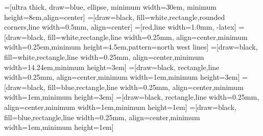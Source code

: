 
=[ultra thick, draw=blue, ellipse, minimum width=30em,
    minimum height=8em,align=center]
=[draw=black, fill=white,rectangle,rounded corners,line width=0.5mm,%
	  align=center]
=[red,line width=1.0mm, -latex]
=[draw=black, fill=white,rectangle,line width=0.25mm,%
	  align=center,minimum width=0.25em,minimum height=4.5em,pattern=north west lines]
=[draw=black, fill=white,rectangle,line width=0.25mm,%
	  align=center,minimum width=14.24em,minimum height=3em]
=[draw=black, rectangle,line width=0.25mm,%
	  align=center,minimum width=1em,minimum height=3em]
=[draw=black, fill=blue,rectangle,line width=0.25mm,%
	  align=center,minimum width=1em,minimum height=3em]
=[draw=black, rectangle,line width=0.25mm,%
	  align=center,minimum width=1em,minimum height=1em]
=[draw=black, fill=blue,rectangle,line width=0.25mm,%
	  align=center,minimum width=1em,minimum height=1em]

